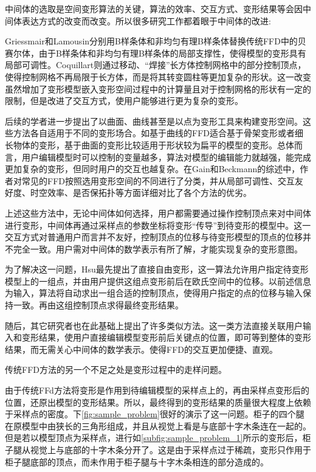 中间体的选取是空间变形算法的关键，算法的效率、交互方式、变形结果等会因中间体表达方式的改变而改变。所以很多研究工作都着眼于中间体的改进:

Griessmair\cite{Griessmair89}和Lamousin\cite{lamousin1994}分别用B样条体和非均匀有理B样条体替换传统FFD\cite{Sederberg86}中的贝赛尔体，由于B样条体和非均匀有理B样条体的局部支撑性，使得模型的变形具有局部可调性。Coquillart\cite{coquillart1990}则通过移动、“焊接”长方体控制网格中的部分控制顶点，使得控制网格不再局限于长方体，而是将其转变圆柱等更加复杂的形状。这一改变虽然增加了变形模型嵌入变形空间过程中的计算量且对于控制网格的形状有一定的限制，但是改进了交互方式，使用户能够进行更为复杂的变形。

后续的学者进一步提出了以曲面、曲线甚至是以点为变形工具来构建变形空间。这些方法各自适用于不同的变形场合。如基于曲线的FFD适合基于骨架变形或者细长物体的变形，基于曲面的变形比较适用于形状较为扁平的模型的变形。总体而言，用户编辑模型时可以控制的变量越多，算法对模型的编辑能力就越强，能完成更加复杂的变形，但同时用户的交互也越复杂。在Gain和Beckmann的综述\cite{Gain08}中，作者对常见的FFD按照选用变形空间的不同进行了分类，并从局部可调性、交互友好度、时空效率、是否保拓扑等方面详细对比了各个方法的优劣。

上述这些方法中，无论中间体如何选择，用户都需要通过操作控制顶点来对中间体进行变形，中间体再通过采样点的参数坐标将变形“传导”到待变形的模型中。这一交互方式对普通用户而言并不友好，控制顶点的位移与待变形模型的顶点的位移并不完全一致。用户需对中间体的数学表示有所了解，才能实现复杂的变形意图。

为了解决这一问题，Hsu\cite{hsu1992}最先提出了直接自由变形，这一算法允许用户指定待变形模型上的一组点，并由用户提供这组点变形前后在欧氏空间中的位移。以前述信息为输入，算法将自动求出一组合适的控制顶点，使得用户指定的点的位移与输入保持一致。再由这组控制顶点求得最终变形结果。

随后，其它研究者也在此基础上提出了许多类似方法。这一类方法直接关联用户输入和变形结果，使用户直接编辑模型变形前后关键点的位置，即可等到整体的变形结果，而无需关心中间体的数学表示。使得FFD的交互更加便捷、直观。

传统FFD方法的另一个不足之处是变形过程中的走样问题。

由于传统FFd方法将变形是作用到待编辑模型的采样点上的，再由采样点变形后的位置，还原出模型的变形结果。所以，最终得到的变形结果的质量很大程度上依赖于采样点的密度。下\autoref{fig:sample_problem}很好的演示了这一问题。柜子的四个腿在原模型中由狭长的三角形组成，并且从视觉上看是与底部十字木条连在一起的。但是若以模型顶点为采样点，进行如\autoref{subfig:sample_problem_1}所示的变形后，柜子腿从视觉上与底部的十字木条分开了。这是由于采样点过于稀疏，变形只作用于柜子腿底部的顶点，而未作用于柜子腿与十字木条相连的部分造成的。


